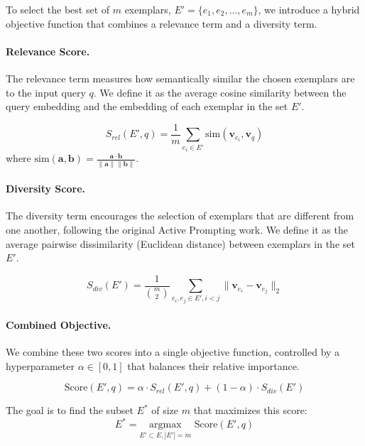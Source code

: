 \documentclass[10pt,twocolumn,letterpaper]{article}
\begin{document}
To select the best set of $m$ exemplars, $E' = \{e_1, e_2, \dots, e_m\}$, we introduce a hybrid objective function that combines a relevance term and a diversity term.

\paragraph{Relevance Score.} The relevance term measures how semantically similar the chosen exemplars are to the input query $q$. We define it as the average cosine similarity between the query embedding and the embedding of each exemplar in the set $E'$.

\begin{equation}
\label{eq:relevance}
S_{rel}(E', q) = \frac{1}{m} \sum_{e_i \in E'} \text{sim}(\mathbf{v}_{e_i}, \mathbf{v}_q)
\end{equation}
where $\text{sim}(\mathbf{a}, \mathbf{b}) = \frac{\mathbf{a} \cdot \mathbf{b}}{\|\mathbf{a}\| \|\mathbf{b}\|}$.

\paragraph{Diversity Score.} The diversity term encourages the selection of exemplars that are different from one another, following the original Active Prompting work. We define it as the average pairwise dissimilarity (Euclidean distance) between exemplars in the set $E'$.

\begin{equation}
\label{eq:diversity}
S_{div}(E') = \frac{1}{\binom{m}{2}} \sum_{e_i, e_j \in E', i < j} \|\mathbf{v}_{e_i} - \mathbf{v}_{e_j}\|_2
\end{equation}

\paragraph{Combined Objective.} We combine these two scores into a single objective function, controlled by a hyperparameter $\alpha \in [0, 1]$ that balances their relative importance.

\begin{equation}
\label{eq:objective}
\text{Score}(E', q) = \alpha \cdot S_{rel}(E', q) + (1-\alpha) \cdot S_{div}(E')
\end{equation}

The goal is to find the subset $E^*$ of size $m$ that maximizes this score:
\begin{equation}
E^* = \underset{E' \subset E, |E'|=m}{\text{argmax}} \text{ Score}(E', q)
\end{equation}
\end{document}
